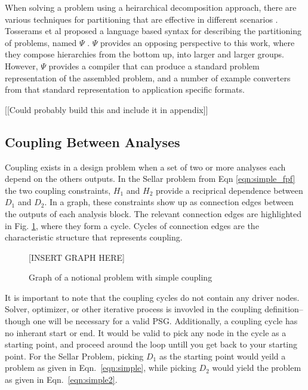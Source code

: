   When solving a problem using a heirarchical decomposition approach, 
  there are various techniques for partitioning that are effective in different 
  scenarios \cite{krishnamachari1997optimal,michelena1997hypergraph,sobieszczanski1997,Perez2004,allison2009optimal}. 
  Tosserams et al proposed a language based syntax for describing the partitioning of problems, named $\Psi$
  \cite{tosserams2010specification}. $\Psi$ provides an opposing perspective to 
  this work, where they compose hierarchies from the bottom up, into larger and 
  larger groups. However, $\Psi$ provides a compiler that can produce a standard 
  problem representation of the assembled problem, and a number of example converters
  from that standard representation to application specific formats. 

  [[Could probably build this and include it in appendix]] 


\subsection{Coupling Between Analyses}

  Coupling exists in a design problem when a set of two or more analyses each depend on the
  others outputs. In the Sellar problem from Eqn \ref{eqn:simple_fpf} the two 
  coupling constraints, $H_1$ and $H_2$ provide a reciprical dependence between 
  $D_1$ and $D_2$. In a graph, these constraints show up as connection edges between 
  the outputs of each analysis block. The relevant connection edges are highlighted in 
  Fig. \ref{f:coupling}, where they form a cycle. Cycles of connection edges are the characteristic 
  structure that represents coupling. 

  \begin{figure}
      \begin{center}
      [INSERT GRAPH HERE]
      \caption{Graph of a notional problem with simple coupling \label{f:coupling}}
      \end{center}
  \end{figure}

  It is important to note that the coupling cycles do not contain 
  any driver nodes. Solver, optimizer, or other iterative process is 
  invovled in the coupling definition--though one will be necessary for a valid 
  PSG. Additionally, a coupling cycle has no inherant start or end. It would be
  valid to pick any node in the cycle as a starting point, and proceed around the
  loop untill you get back to your starting point. For the Sellar Problem, picking 
  $D_1$ as the starting point would yeild a problem as given in 
  Eqn.~\ref{eqn:simple}, while picking $D_2$ would yield the problem as given in 
  Eqn.~\ref{eqn:simple2}.

